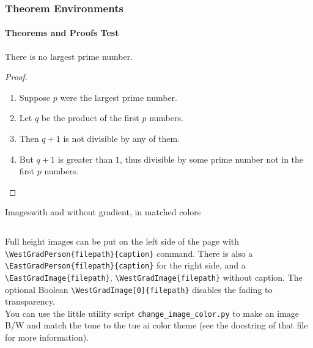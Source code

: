 \documentclass[10pt,aspectratio=169]{beamer}
\begin{document}
\begin{frame}
    \frametitle{Theorem Environments}
    \framesubtitle{Theorems and Proofs \hfill Test}
    \begin{theorem}
        There is \alert{no largest} prime number.
    \end{theorem}
    \begin{proof}
        \begin{enumerate}
            \item<1-| alert@1> Suppose $p$ were the largest prime number.
            \item<2-> Let $q$ be the product of the first $p$ numbers.
            \item<3-> Then $q+1$ is not divisible by any of them.
            \item<1-> But $q + 1$ is greater than $1$, thus divisible by some prime
                  number not in the first $p$ numbers.
        \end{enumerate}
    \end{proof}
\end{frame}

\begin{frame}{Images}{with and without gradient, in matched colors}


    \begin{columns}
        Full height images can be put on the left side of the page with \texttt{\textbackslash{}WestGradPerson\{filepath\}\{caption\}} command. There is also a \texttt{\textbackslash{}EastGradPerson\{filepath\}\{caption\}} for the right side, and a \texttt{\textbackslash{}EastGradImage\{filepath\}}, \texttt{\textbackslash{}WestGradImage\{filepath\}} without caption. The optional Boolean \texttt{\textbackslash{}WestGradImage[0]\{filepath\}} disables the fading to transparency.\\

        You can use the little utility script \texttt{change\_image\_color.py} to make an image B/W and match the tone to the tue ai color theme (see the docstring of that file for more information).
    \end{columns}

\end{frame}
\end{document}
